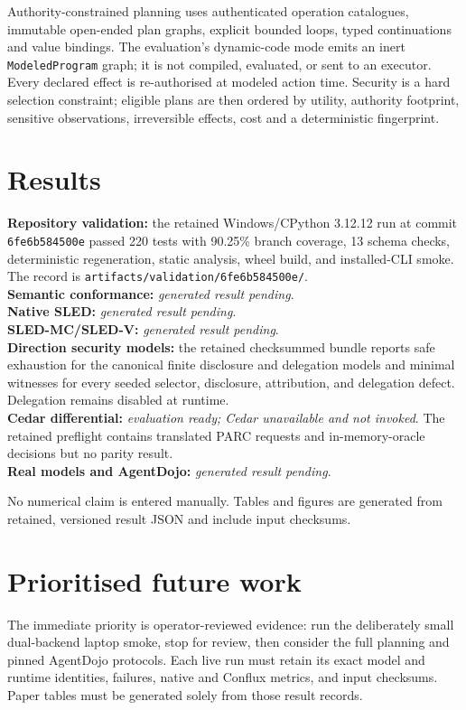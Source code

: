 \documentclass[11pt]{article}
\begin{document}
Authority-constrained planning uses authenticated operation catalogues,
immutable open-ended plan graphs, explicit bounded loops, typed continuations
and value bindings. The evaluation's dynamic-code mode emits an inert
\texttt{ModeledProgram} graph; it is not compiled, evaluated, or sent to an
executor. Every declared effect is re-authorised at modeled action time.
Security is a hard selection constraint;
eligible plans are then ordered by utility, authority footprint, sensitive
observations, irreversible effects, cost and a deterministic fingerprint.

\section{Results}
\textbf{Repository validation:} the retained Windows/CPython 3.12.12 run at
commit \texttt{6fe6b584500e} passed 220 tests with 90.25\% branch coverage,
13 schema checks, deterministic regeneration, static analysis, wheel build,
and installed-CLI smoke. The record is
\texttt{artifacts/validation/6fe6b584500e/}.\\
\textbf{Semantic conformance:} \emph{generated result pending}.\\
\textbf{Native SLED:} \emph{generated result pending}.\\
\textbf{SLED-MC/SLED-V:} \emph{generated result pending}.\\
\textbf{Direction security models:} the retained checksummed bundle reports
safe exhaustion for the canonical finite disclosure and delegation models and
minimal witnesses for every seeded selector, disclosure, attribution, and
delegation defect. Delegation remains disabled at runtime.\\
\textbf{Cedar differential:} \emph{evaluation ready; Cedar unavailable and not
invoked}. The retained preflight contains translated PARC requests and
in-memory-oracle decisions but no parity result.\\
\textbf{Real models and AgentDojo:} \emph{generated result pending}.

No numerical claim is entered manually. Tables and figures are generated from
retained, versioned result JSON and include input checksums.

\section{Prioritised future work}

The immediate priority is operator-reviewed evidence: run the deliberately
small dual-backend laptop smoke, stop for review, then consider the full
planning and pinned AgentDojo protocols. Each live run must retain its exact
model and runtime identities, failures, native and Conflux metrics, and input
checksums. Paper tables must be generated solely from those result records.
\end{document}
